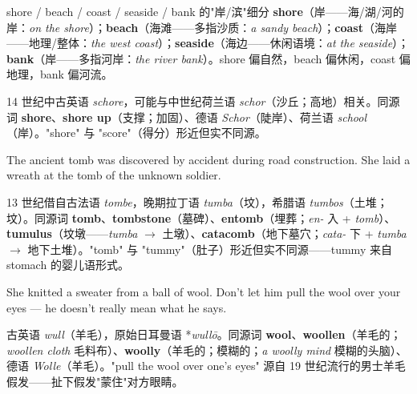 \documentclass[../main.tex]{subfiles}
\begin{document}
\begin{lex}{shore / beach / coast / seaside / bank 的"岸/滨"细分}
\textbf{shore}（岸——海/湖/河的岸：\textit{on the shore}）；\textbf{beach}（海滩——多指沙质：\textit{a sandy beach}）；\textbf{coast}（海岸——地理/整体：\textit{the west coast}）；\textbf{seaside}（海边——休闲语境：\textit{at the seaside}）；\textbf{bank}（岸——多指河岸：\textit{the river bank}）。shore 偏自然，beach 偏休闲，coast 偏地理，bank 偏河流。
\end{lex}

\begin{origin}
14 世纪中古英语 \textit{schore}，可能与中世纪荷兰语 \textit{schor}（沙丘；高地）相关。同源词 \textbf{shore}、\textbf{shore up}（支撑；加固）、德语 \textit{Schor}（陡岸）、荷兰语 \textit{school}（岸）。"shore" 与 "score"（得分）形近但实不同源。
\end{origin}


{The ancient tomb was discovered by accident during road construction.}
{She laid a wreath at the tomb of the unknown soldier.}

\begin{origin}
13 世纪借自古法语 \textit{tombe}，晚期拉丁语 \textit{tumba}（坟），希腊语 \textit{tumbos}（土堆；坟）。同源词 \textbf{tomb}、\textbf{tombstone}（墓碑）、\textbf{entomb}（埋葬；\textit{en-} 入 + \textit{tomb}）、\textbf{tumulus}（坟墩——\textit{tumba} $\to$ 土墩）、\textbf{catacomb}（地下墓穴；\textit{cata-} 下 + \textit{tumba} $\to$ 地下土堆）。"tomb" 与 "tummy"（肚子）形近但实不同源——tummy 来自 stomach 的婴儿语形式。
\end{origin}


{She knitted a sweater from a ball of wool.}
{Don't let him pull the wool over your eyes — he doesn't really mean what he says.}

\begin{origin}
古英语 \textit{wull}（羊毛），原始日耳曼语 *\textit{wullō}。同源词 \textbf{wool}、\textbf{woollen}（羊毛的；\textit{woollen cloth} 毛料布）、\textbf{woolly}（羊毛的；模糊的；\textit{a woolly mind} 模糊的头脑）、德语 \textit{Wolle}（羊毛）。"pull the wool over one's eyes" 源自 19 世纪流行的男士羊毛假发——扯下假发"蒙住"对方眼睛。
\end{origin}
\end{document}
